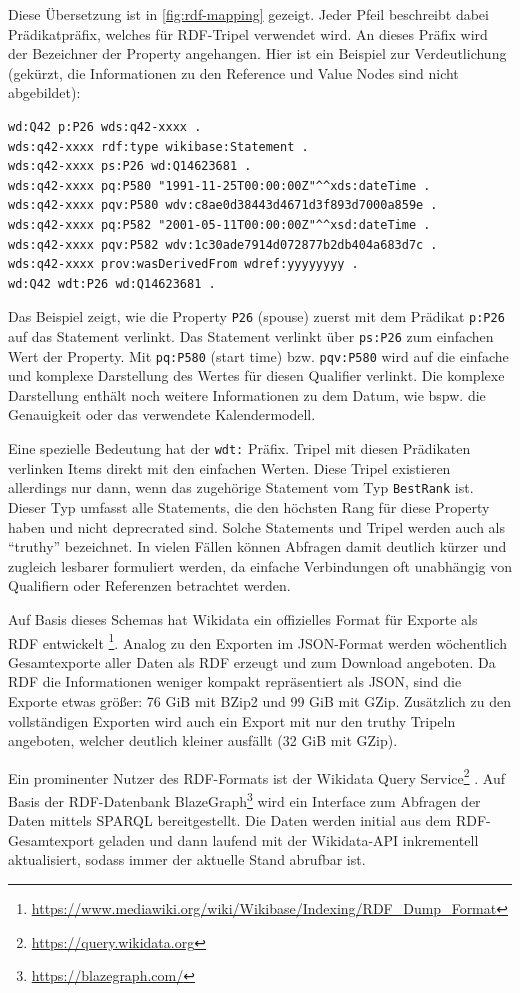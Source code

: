 Diese Übersetzung ist in \cref{fig:rdf-mapping} gezeigt.
Jeder Pfeil beschreibt dabei Prädikatpräfix, welches für RDF-Tripel verwendet wird.
An dieses Präfix wird der Bezeichner der Property angehangen.
Hier ist ein Beispiel zur Verdeutlichung (gekürzt, die Informationen zu den Reference und Value Nodes sind nicht abgebildet):
\begin{lstlisting}[language=SPARQL]
wd:Q42 p:P26 wds:q42-xxxx .
wds:q42-xxxx rdf:type wikibase:Statement .
wds:q42-xxxx ps:P26 wd:Q14623681 .
wds:q42-xxxx pq:P580 "1991-11-25T00:00:00Z"^^xds:dateTime .
wds:q42-xxxx pqv:P580 wdv:c8ae0d38443d4671d3f893d7000a859e .
wds:q42-xxxx pq:P582 "2001-05-11T00:00:00Z"^^xsd:dateTime .
wds:q42-xxxx pqv:P582 wdv:1c30ade7914d072877b2db404a683d7c .
wds:q42-xxxx prov:wasDerivedFrom wdref:yyyyyyyy .
wd:Q42 wdt:P26 wd:Q14623681 .
\end{lstlisting}
Das Beispiel zeigt, wie die Property \verb|P26| (spouse) zuerst mit dem Prädikat \verb|p:P26| auf das Statement verlinkt.
Das Statement verlinkt über \verb|ps:P26| zum einfachen Wert der Property.
Mit \verb|pq:P580| (start time) bzw. \verb|pqv:P580| wird auf die einfache und komplexe Darstellung des Wertes für diesen Qualifier verlinkt.
Die komplexe Darstellung enthält noch weitere Informationen zu dem Datum, wie bspw. die Genauigkeit oder das verwendete Kalendermodell.

Eine spezielle Bedeutung hat der \verb|wdt:| Präfix.
Tripel mit diesen Prädikaten verlinken Items direkt mit den einfachen Werten.
Diese Tripel existieren allerdings nur dann, wenn das zugehörige Statement vom Typ \verb|BestRank| ist.
Dieser Typ umfasst alle Statements, die den höchsten Rang für diese Property haben und nicht deprecrated sind.
Solche Statements und Tripel werden auch als "`truthy"' bezeichnet.
In vielen Fällen können Abfragen damit deutlich kürzer und zugleich lesbarer formuliert werden, da einfache Verbindungen oft unabhängig von Qualifiern oder Referenzen betrachtet werden.

Auf Basis dieses Schemas hat Wikidata ein offizielles Format für Exporte als RDF entwickelt \footnote{\url{https://www.mediawiki.org/wiki/Wikibase/Indexing/RDF_Dump_Format}}.
Analog zu den Exporten im JSON-Format werden wöchentlich Gesamtexporte aller Daten als RDF erzeugt und zum Download angeboten.
Da RDF die Informationen weniger kompakt repräsentiert als JSON, sind die Exporte etwas größer: 76 GiB mit BZip2 und 99 GiB mit GZip.
Zusätzlich zu den vollständigen Exporten wird auch ein Export mit nur den truthy Tripeln angeboten, welcher deutlich kleiner ausfällt (32 GiB mit GZip).

Ein prominenter Nutzer des RDF-Formats ist der Wikidata Query Service\footnote{\url{https://query.wikidata.org}} \cite{wd-sparql}.
Auf Basis der RDF-Datenbank BlazeGraph\footnote{\url{https://blazegraph.com/}} wird ein Interface zum Abfragen der Daten mittels SPARQL bereitgestellt.
Die Daten werden initial aus dem RDF-Gesamtexport geladen und dann laufend mit der Wikidata-API inkrementell aktualisiert, sodass immer der aktuelle Stand abrufbar ist.